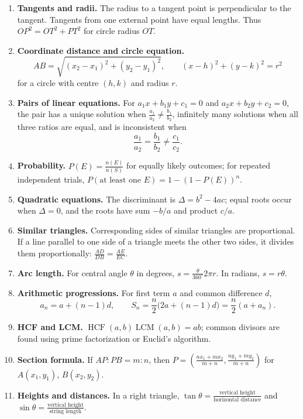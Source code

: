 \begin{enumerate}[label=\textbf{1.1.\arabic*.},ref=1.1.\arabic*]
\setlength{\itemsep}{0.35em}
\item \label{formula-1-1-1} \textbf{Tangents and radii.} The radius to a tangent point is perpendicular to the tangent. Tangents from one external point have equal lengths. Thus $OP^2=OT^2+PT^2$ for circle radius $OT$.
\item \label{formula-1-1-2} \textbf{Coordinate distance and circle equation.}
\begin{equation*}\tag{1.1.2.1}
AB=\sqrt{(x_2-x_1)^2+(y_2-y_1)^2},\qquad
(x-h)^2+(y-k)^2=r^2
\end{equation*}
for a circle with centre $(h,k)$ and radius $r$.
\item \label{formula-1-1-3} \textbf{Pairs of linear equations.} For $a_1x+b_1y+c_1=0$ and $a_2x+b_2y+c_2=0$, the pair has a unique solution when $\frac{a_1}{a_2}\ne\frac{b_1}{b_2}$, infinitely many solutions when all three ratios are equal, and is inconsistent when
\begin{equation*}\tag{1.1.3.1}
\frac{a_1}{a_2}=\frac{b_1}{b_2}\ne\frac{c_1}{c_2}.
\end{equation*}
\item \label{formula-1-1-4} \textbf{Probability.} $P(E)=\frac{n(E)}{n(S)}$ for equally likely outcomes; for repeated independent trials, $P(\text{at least one }E)=1-(1-P(E))^n$.
\item \label{formula-1-1-5} \textbf{Quadratic equations.} The discriminant is $\Delta=b^2-4ac$; equal roots occur when $\Delta=0$, and the roots have sum $-b/a$ and product $c/a$.
\item \label{formula-1-1-6} \textbf{Similar triangles.} Corresponding sides of similar triangles are proportional. If a line parallel to one side of a triangle meets the other two sides, it divides them proportionally: $\frac{AD}{DB}=\frac{AE}{EC}$.
\item \label{formula-1-1-7} \textbf{Arc length.} For central angle $\theta$ in degrees, $s=\frac{\theta}{360^\circ}2\pi r$. In radians, $s=r\theta$.
\item \label{formula-1-1-8} \textbf{Arithmetic progressions.} For first term $a$ and common difference $d$,
\begin{equation*}\tag{1.1.8.1}
a_n=a+(n-1)d,\qquad S_n=\frac n2\bigl(2a+(n-1)d\bigr)=\frac n2(a+a_n).
\end{equation*}
\item \label{formula-1-1-9} \textbf{HCF and LCM.} $\operatorname{HCF}(a,b)\operatorname{LCM}(a,b)=ab$; common divisors are found using prime factorization or Euclid's algorithm.
\item \label{formula-1-1-10} \textbf{Section formula.} If $AP:PB=m:n$, then $P=\left(\frac{nx_1+mx_2}{m+n},\frac{ny_1+my_2}{m+n}\right)$ for $A(x_1,y_1)$, $B(x_2,y_2)$.
\item \label{formula-1-1-11} \textbf{Heights and distances.} In a right triangle, $\tan\theta=\frac{\text{vertical height}}{\text{horizontal distance}}$ and $\sin\theta=\frac{\text{vertical height}}{\text{string length}}$.
\end{enumerate}
